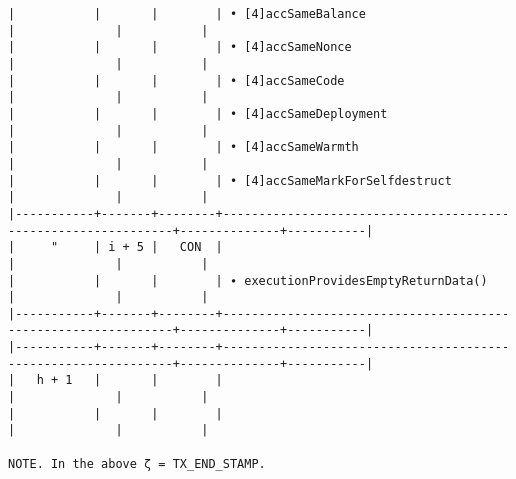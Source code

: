 \documentclass[varwidth=\maxdimen,margin=0.5cm,multi={verbatim}]{standalone}
\begin{document}
\begin{verbatim}
|           |       |        | • [4]accSameBalance                                           |              |           |
|           |       |        | • [4]accSameNonce                                             |              |           |
|           |       |        | • [4]accSameCode                                              |              |           |
|           |       |        | • [4]accSameDeployment                                        |              |           |
|           |       |        | • [4]accSameWarmth                                            |              |           |
|           |       |        | • [4]accSameMarkForSelfdestruct                               |              |           |
|-----------+-------+--------+---------------------------------------------------------------+--------------+-----------|
|     "     | i + 5 |   CON  |                                                               |              |           |
|           |       |        | ∙ executionProvidesEmptyReturnData()                          |              |           |
|-----------+-------+--------+---------------------------------------------------------------+--------------+-----------|
|-----------+-------+--------+---------------------------------------------------------------+--------------+-----------|
|   h + 1   |       |        |                                                               |              |           |
|           |       |        |                                                               |              |           |

NOTE. In the above ζ = TX_END_STAMP. 
\end{verbatim}
\end{document}
